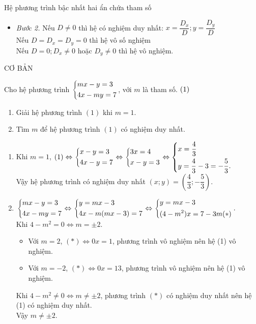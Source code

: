 \begin{dang}{Hệ phương trình bậc nhất hai ẩn chứa tham số}
\begin{enumerate}[1)]
\begin{itemize}
 \item {\it Bước 2.} Nếu $D\ne 0$ thì hệ có nghiệm duy nhất: $x=\dfrac{D_x}{D};y=\dfrac{D_y}{D}$\\
               Nếu $D=D_x=D_y=0$ thì hệ vô số nghiệm\\
               Nếu $D=0; D_x\neq 0$ hoặc $D_y\neq 0$ thì hệ vô nghiệm.
\end{itemize}
\end{enumerate}
\end{dang}

\begin{center}
	CƠ BẢN
\end{center}
\begin{ex}%
    Cho hệ phương trình $\left\{\begin{aligned}&mx-y=3\\&4x-my=7\end{aligned}\right.$, với $m$ là tham số. $\hfill(1)$
    \begin{enumerate}
        \item Giải hệ phương trình $(1)$ khi $m=1$.
        \item Tìm $m$ để hệ phương trình $(1)$ có nghiệm duy nhất.
    \end{enumerate}
\loigiai
    {
    \begin{enumerate}
        \item Khi $m=1$, $(1) \Leftrightarrow \left\{\begin{aligned}&x-y=3\\&4x-y=7\end{aligned}\right. \Leftrightarrow \left\{\begin{aligned}&3x=4\\&x-y=3\end{aligned}\right. \Leftrightarrow \left\{\begin{aligned}&x=\dfrac{4}{3}\\&y=\dfrac{4}{3}-3=-\dfrac{5}{3}.\end{aligned}\right.$\\
        Vậy hệ phương trình có nghiệm duy nhất $(x; y)=\left(\dfrac{4}{3}; -\dfrac{5}{3}\right)$.
        \item  $\left\{\begin{aligned}&mx-y=3\\&4x-my=7\end{aligned}\right. \Leftrightarrow \left\{\begin{aligned}&y=mx-3\\&4x-m(mx-3)=7\end{aligned}\right. \Leftrightarrow \left\{\begin{aligned}&y=mx-3\\&(4-m^2)x=7-3m (\ast)\end{aligned}\right..$\\
        Khi $4-m^2=0 \Leftrightarrow m=\pm 2.$
        \begin{itemize}
        	\item Với $m=2$, $(\ast) \Leftrightarrow 0x=1$, phương trình vô nghiệm nên hệ (1) vô nghiệm.
        	\item Với $m=-2$, $(\ast) \Leftrightarrow 0x=13$, phương trình vô nghiệm nên hệ (1) vô nghiệm.
        \end{itemize}
      Khi $4-m^2\neq 0 \Leftrightarrow m \neq \pm 2$, phương trình $(\ast)$ có nghiệm duy nhất nên hệ (1) có nghiệm duy nhất.\\
      Vậy $m \neq \pm 2$.
    \end{enumerate}
    }
\end{ex}
